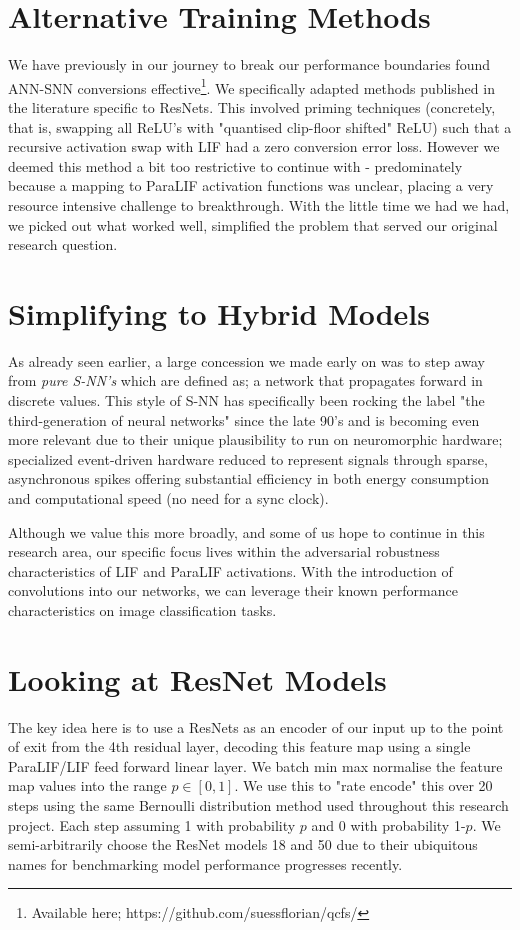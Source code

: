 \documentclass[conference]{IEEEtran}
\begin{document}
\section{Alternative Training Methods}
We have previously in our journey to break our performance boundaries found ANN-SNN conversions effective\footnote{Available here; https://github.com/suessflorian/qcfs/}. We specifically adapted methods published in the literature specific to ResNets. This involved priming techniques (concretely, that is, swapping all ReLU's with "quantised clip-floor shifted" ReLU) such that a recursive activation swap with LIF had a zero conversion error loss. However we deemed this method a bit too restrictive to continue with - predominately because a mapping to ParaLIF activation functions was unclear, placing a very resource intensive challenge to breakthrough. With the little time we had we had, we picked out what worked well, simplified the problem that served our original research question.

\section{Simplifying to Hybrid Models}
As already seen earlier, a large concession we made early on was to step away from \emph{pure S-NN's} which are defined as; a network that propagates forward in discrete values. This style of S-NN has specifically been rocking the label "the third-generation of neural networks" since the late 90's and is becoming even more relevant due to their unique plausibility to run on neuromorphic hardware; specialized event-driven hardware reduced to represent signals through sparse, asynchronous spikes offering substantial efficiency in both energy consumption and computational speed (no need for a sync clock).

Although we value this more broadly, and some of us hope to continue in this research area, our specific focus lives within the adversarial robustness characteristics of LIF and ParaLIF activations. With the introduction of convolutions into our networks, we can leverage their known performance characteristics on image classification tasks.

\section{Looking at ResNet Models}
The key idea here is to use a ResNets as an encoder of our input up to the point of exit from the 4th residual layer, decoding this feature map using a single ParaLIF/LIF feed forward linear layer. We batch min max normalise the feature map values into the range $p \in [0,1]$. We use this to "rate encode" this over 20 steps using the same Bernoulli distribution method used throughout this research project. Each step assuming 1 with probability $p$ and 0 with probability 1-$p$. We semi-arbitrarily choose the ResNet models 18 and 50 due to their ubiquitous names for benchmarking model performance progresses recently.
\end{document}
